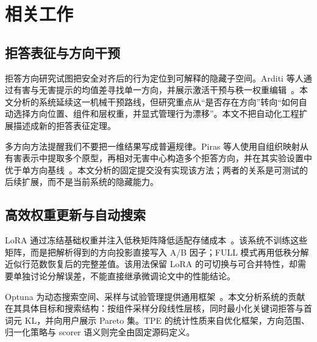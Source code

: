 \section{相关工作}

\subsection{拒答表征与方向干预}

拒答方向研究试图把安全对齐后的行为定位到可解释的隐藏子空间。Arditi 等人通过有害与无害提示的均值差寻找单一方向，并展示激活干预与秩一权重编辑~\cite{arditi2024refusal}。本文分析的系统延续这一机械干预路线，但研究重点从“是否存在方向”转向“如何自动选择方向位置、组件和层权重，并显式管理行为漂移”。本文不把自动化工程扩展描述成新的拒答表征定理。

多方向方法提醒我们不要把一维结果写成普遍规律。Piras 等人使用自组织映射从有害表示中提取多个原型，再相对无害中心构造多个拒答方向，并在其实验设置中优于单方向基线~\cite{piras2026som}。本文分析的固定提交没有实现该方法；两者的关系是可测试的后续扩展，而不是当前系统的隐藏能力。

\subsection{高效权重更新与自动搜索}

LoRA 通过冻结基础权重并注入低秩矩阵降低适配存储成本~\cite{hu2022lora}。该系统不训练这些矩阵，而是把解析得到的方向投影直接写入 A/B 因子；FULL 模式再用低秩分解近似行范数恢复后的完整差值。该用法保留 LoRA 的可切换与可合并特性，却需要单独讨论分解误差，不能直接继承微调论文中的性能结论。

Optuna 为动态搜索空间、采样与试验管理提供通用框架~\cite{akiba2019optuna}。本文分析系统的贡献在其具体目标和搜索结构：按组件采样分段线性层核，同时最小化关键词拒答与首词元 KL，并向用户展示 Pareto 集。TPE 的统计性质来自优化框架，方向范围、归一化策略与 scorer 语义则完全由固定源码定义。
